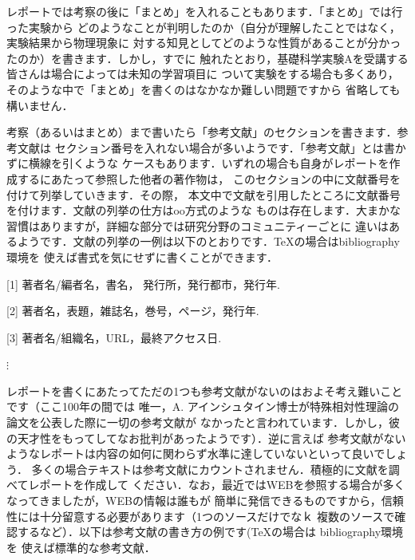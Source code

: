\documentclass[a4paper,10pt]{jarticle}
\begin{document}
レポートでは考察の後に「まとめ」を入れることもあります．「まとめ」では行った実験から
どのようなことが判明したのか（自分が理解したことではなく，実験結果から物理現象に
対する知見としてどのような性質があることが分かったのか）を書きます．しかし，すでに
触れたとおり，基礎科学実験Aを受講する皆さんは場合によっては未知の学習項目に
ついて実験をする場合も多くあり，そのような中で「まとめ」を書くのはなかなか難しい問題ですから
省略しても構いません．

\vspace{3mm}
考察（あるいはまとめ）まで書いたら「参考文献」のセクションを書きます．参考文献は
セクション番号を入れない場合が多いようです．「参考文献」とは書かずに横線を引くような
ケースもあります．いずれの場合も自身がレポートを作成するにあたって参照した他者の著作物は，
このセクションの中に文献番号を付けて列挙していきます．その際，
本文中で文献を引用したところに文献番号を付けます．文献の列挙の仕方はoo方式のような
ものは存在します．大まかな習慣はありますが，詳細な部分では研究分野のコミュニティーごとに
違いはあるようです．文献の列挙の一例は以下のとおりです．\TeX の場合はbibliography環境を
使えば書式を気にせずに書くことができます．

\vspace{2mm}
[1] 著者名/編者名，書名， 発行所，発行都市，発行年. 

[2] 著者名，表題，雑誌名，巻号，ページ，発行年.

[3] 著者名/組織名，URL，最終アクセス日.

$\vdots$

\vspace{3mm}
レポートを書くにあたってただの1つも参考文献がないのはおよそ考え難いことです（ここ100年の間では
唯一，A. アインシュタイン博士が特殊相対性理論の論文を公表した際に一切の参考文献が
なかったと言われています．しかし，彼の天才性をもってしてなお批判があったようです）．逆に言えば
参考文献がないようなレポートは内容の如何に関わらず水準に達していないといって良いでしょう．
多くの場合テキストは参考文献にカウントされません．積極的に文献を調べてレポートを作成して
ください．なお，最近ではWEBを参照する場合が多くなってきましたが，WEBの情報は誰もが
簡単に発信できるものですから，信頼性には十分留意する必要があります（1つのソースだけでなｋ
複数のソースで確認するなど）．以下は参考文献の書き方の例です(\TeX の場合は bibliography環境を
使えば標準的な参考文献．
\end{document}
